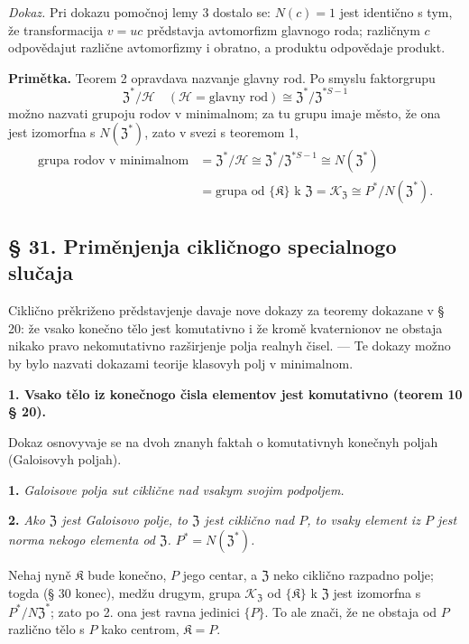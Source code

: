 \documentclass[11pt]{article}
\begin{document}
\noindent\emph{Dokaz.} Pri dokazu pomočnoj lemy 3 dostalo se: \(N(c)=1\) jest identično s tym, že transformacija \(v=uc\) prědstavja avtomorfizm glavnogo roda; različnym \(c\) odpovědajut različne avtomorfizmy i obratno, a produktu odpovědaje produkt.

\noindent\textbf{Primětka.} Teorem 2 opravdava nazvanje glavny rod. Po smyslu faktorgrupu
\[
\mathfrak Z^*/\mathscr H
\quad(\mathscr H=\text{glavny rod})
\cong\mathfrak Z^*/\mathfrak Z^{*S-1}
\]
možno nazvati grupoju rodov v minimalnom; za tu grupu imaje město, že ona jest izomorfna s \(N(\mathfrak Z^*)\), zato v svezi s teoremom 1,
\[
\begin{aligned}
\text{grupa rodov v minimalnom}
&=\mathfrak Z^*/\mathscr H
 \cong\mathfrak Z^*/\mathfrak Z^{*S-1}
 \cong N(\mathfrak Z^*)\\
&=\text{grupa od }\{\mathfrak K\}\text{ k }\mathfrak Z
 =\mathscr K_{\mathfrak Z}
 \cong P^*/N(\mathfrak Z^*).
\end{aligned}
\]

\subsection*{§ 31. Priměnjenja cikličnogo specialnogo slučaja}\label{anwendungen-des-zyklischen-spezialfalles}

Ciklično prěkriženo prědstavjenje davaje nove dokazy za teoremy dokazane v § 20: že vsako konečno tělo jest komutativno i že kromě kvaternionov ne obstaja nikako pravo nekomutativno razširjenje polja realnyh čisel. --- Te dokazy možno by bylo nazvati dokazami teorije klasovyh polj v minimalnom.

\noindent\textbf{1. Vsako tělo iz konečnogo čisla elementov jest komutativno (teorem 10 § 20).}

Dokaz osnovyvaje se na dvoh znanyh faktah o komutativnyh konečnyh poljah (Galoisovyh poljah).

\noindent\textbf{1.} \emph{Galoisove polja sut ciklične nad vsakym svojim podpoljem.}

\noindent\textbf{2.} \emph{Ako \(\mathfrak Z\) jest Galoisovo polje, to \(\mathfrak Z\) jest ciklično nad \(P\), to vsaky element iz \(P\) jest norma nekogo elementa od \(\mathfrak Z\). \(P^*=N(\mathfrak Z^*)\).}

Nehaj nyně \(\mathfrak K\) bude konečno, \(P\) jego centar, a \(\mathfrak Z\) neko ciklično razpadno polje; togda (§ 30 konec), medžu drugym, grupa \(\mathscr K_{\mathfrak Z}\) od \(\{\mathfrak K\}\) k \(\mathfrak Z\) jest izomorfna s \(P^*/N\mathfrak Z^*\); zato po 2. ona jest ravna jedinici \(\{P\}\). To ale znači, že ne obstaja od \(P\) različno tělo s \(P\) kako centrom, \(\mathfrak K=P\).
\end{document}
